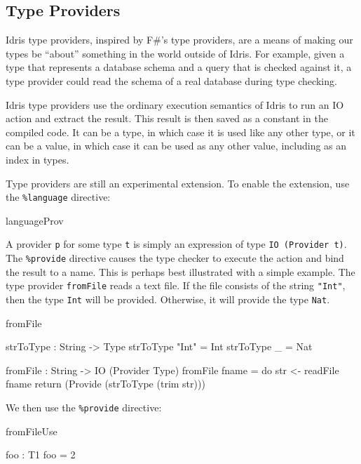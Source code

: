\subsection{Type Providers}
Idris type providers, inspired by F\#'s type providers, are a means of making
our types be ``about'' something in the world outside of Idris. For example,
given a type that represents a database schema and a query that is checked
against it, a type provider could read the schema of a real database during
type checking.

Idris type providers use the ordinary execution semantics of Idris to run an
IO action and extract the result. This result is then saved as a constant in
the compiled code. It can be a type, in which case it is used like any other
type, or it can be a value, in which case it can be used as any other value,
including as an index in types.

Type providers are still an experimental extension. To enable the extension,
use the \texttt{\%language} directive:
\begin{SaveVerbatim}{languageProv}


\end{SaveVerbatim}



A provider \texttt{p} for some type \texttt{t} is simply an expression of type
\texttt{IO (Provider t)}. The \texttt{\%provide} directive causes the type
checker to execute the action and bind the result to a name.  This is perhaps
best illustrated with a simple example. The type provider \texttt{fromFile}
reads a text file. If the file consists of the string \texttt{"Int"}, then the
type \texttt{Int} will be provided. Otherwise, it will provide the type
\texttt{Nat}.

\begin{SaveVerbatim}{fromFile}

strToType : String -> Type
strToType "Int" = Int
strToType _ = Nat

fromFile : String -> IO (Provider Type)
fromFile fname = do str <- readFile fname
                    return (Provide (strToType (trim str)))

\end{SaveVerbatim}

We then use the \texttt{\%provide} directive:

\begin{SaveVerbatim}{fromFileUse}


foo : T1
foo = 2

\end{SaveVerbatim}

